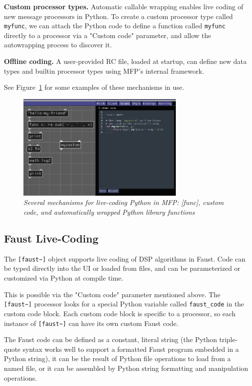 \documentclass[a4paper]{article}
\def\:{\hskip0pt}
\begin{document}
{\bf Custom processor types.} Automatic callable wrapping enables
live coding of new message processors in Python. To create a
custom processor type called {\tt myfunc}, we can attach the
Python code to define a function called {\tt myfunc} directly to
a processor via a "Custom code" parameter, and allow the
autowrapping process to discover it.

{\bf Offline coding.} A user\:-\:provided RC file, loaded at startup,
can define new data types and builtin processor types using MFP's
internal framework.

See Figure~\ref{fig:pythonlivecoding} for some examples of these
mechanisms in use.

\begin{figure}[ht]
\centerline{\includegraphics[width=3.25in]{python_livecoding.png}}
\caption{\label{fig:pythonlivecoding}{
    \it Several mechanisms for live-coding Python in MFP:
    [func], custom code, and automatically wrapped Python
    library functions
}}
\end{figure}

\subsection{Faust Live-Coding }

The {\tt [faust\textasciitilde]} object supports live coding of
DSP algorithms in Faust. Code can be typed directly into the UI
or loaded from files, and can be parameterized or customized via
Python at compile time.

This is possible via the "Custom code" parameter mentioned above.
The {\tt [faust\textasciitilde]} processor looks for a special
Python variable called {\tt faust\_code} in the custom code
block. Each custom code block is specific to a processor, so each
instance of {\tt [faust\textasciitilde]} can have its own custom
Faust code.

The Faust code can be defined as a constant, literal string (the
Python triple\:-\:quote syntax works well to support a formatted
Faust program embedded in a Python string), it can be the result
of Python file operations to load from a named file, or it can be
assembled by Python string formatting and manipulation
operations.
\end{document}
